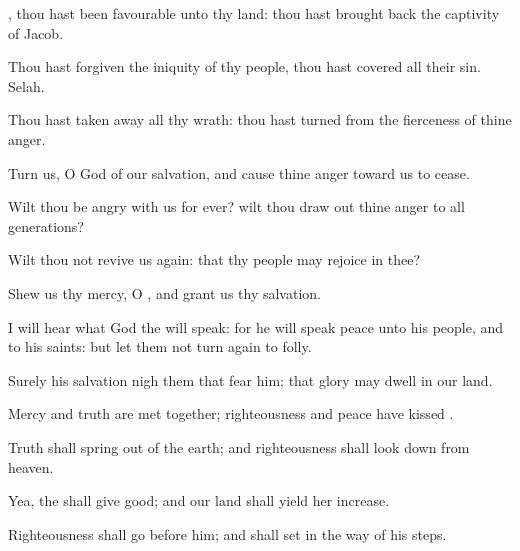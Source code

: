 {\Q {}, thou hast been
favourable unto thy
land: thou hast brought
back the
captivity of
Jacob.


\par }{\Q {}Thou hast
forgiven the
iniquity of thy
people, thou hast
covered all their
sin.
Selah.


\par }{\Q {}Thou hast taken
away all thy
wrath: thou hast
turned
{} from the
fierceness of thine
anger.


\par }{\Q {}Turn us, O
God of our
salvation, and cause thine
anger toward us to
cease.


\par }{\Q {}Wilt thou be
angry with us for
ever? wilt thou draw
out thine
anger to
all
generations?


\par }{\Q {}Wilt thou not
revive us
again: that thy
people may
rejoice in thee?


\par }{\Q {}Shew us thy
mercy, O
{}, and
grant us thy
salvation.


\par }{\BB \par }
{\Q {}I will
hear what
God the
{} will
speak: for he will
speak
peace unto his
people, and to his
saints: but let them not turn
again to
folly.


\par }{\Q {}Surely his
salvation
{}
nigh them that
fear him; that
glory may
dwell in our
land.


\par }{\Q {}Mercy and
truth are met
together;
righteousness and
peace have
kissed
{}.


\par }{\Q {}Truth shall spring
out of the
earth; and
righteousness shall look
down from
heaven.


\par }{\Q {}Yea, the
{} shall
give
{}
good; and our
land shall
yield her
increase.


\par }{\Q {}Righteousness shall
go
before him; and shall
set
{} in the
way of his
steps.




\par }

